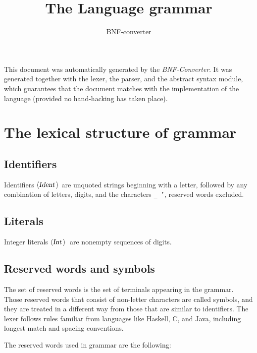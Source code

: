\documentclass[a4paper,11pt]{article}
\author{BNF-converter}
\title{The Language grammar}
\begin{document}
\maketitle

\newcommand{\emptyP}{\mbox{$\epsilon$}}
\newcommand{\terminal}[1]{\mbox{{\texttt {#1}}}}
\newcommand{\nonterminal}[1]{\mbox{$\langle \mbox{{\sl #1 }} \! \rangle$}}
\newcommand{\arrow}{\mbox{::=}}
\newcommand{\delimit}{\mbox{$|$}}
\newcommand{\reserved}[1]{\mbox{{\texttt {#1}}}}
\newcommand{\literal}[1]{\mbox{{\texttt {#1}}}}
\newcommand{\symb}[1]{\mbox{{\texttt {#1}}}}

This document was automatically generated by the {\em BNF-Converter}. It was generated together with the lexer, the parser, and the abstract syntax module, which guarantees that the document matches with the implementation of the language (provided no hand-hacking has taken place).

\section*{The lexical structure of grammar}
\subsection*{Identifiers}
Identifiers \nonterminal{Ident} are unquoted strings beginning with a letter,
followed by any combination of letters, digits, and the characters {\tt \_ '},
reserved words excluded.


\subsection*{Literals}
Integer literals \nonterminal{Int}\ are nonempty sequences of digits.




\subsection*{Reserved words and symbols}
The set of reserved words is the set of terminals appearing in the grammar. Those reserved words that consist of non-letter characters are called symbols, and they are treated in a different way from those that are similar to identifiers. The lexer follows rules familiar from languages like Haskell, C, and Java, including longest match and spacing conventions.

The reserved words used in grammar are the following: \\
\end{document}
